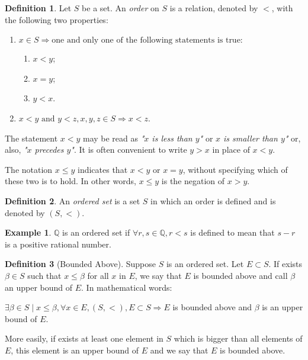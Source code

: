 \documentclass[11pt, a4paper]{amsart}
\numberwithin{equation}{section}
\theoremstyle{plain} %
\theoremstyle{definition}
\newtheorem{defn}{Definition}[section]
\newtheorem{ex}{Example}[section]
\theoremstyle{remark}
\begin{document}
\begin{defn}
Let $S$ be a set. An \textit{order} on $S$ is a relation, denoted by $<$, with the following two properties:
\begin{enumerate}
    \item $x \in S \Rightarrow \text{one and only one of the following statements is true:}$
    \begin{enumerate}
        \item $x<y$;
        \item $x=y$;
        \item $y<x$.
    \end{enumerate}
    \item $x<y \text{ and } y<z, x,y,z \in S \Rightarrow x<z$.
\end{enumerate}
\end{defn}

The statement $x<y$ may be read as \textit{"$x$ is less than $y$"} or \textit{$x$ is smaller than $y$"} or, also, \textit{"$x$ precedes $y$"}. It is often convenient to write $y>x$ in place of $x<y$.

The notation $x\leq y$ indicates that $x<y$ or $x=y$, without specifying which of these two is to hold. In other words, $x\leq y$ is the negation of $x>y$.

\begin{defn}
An \textit{ordered set} is a set $S$ in which an order is defined and is denoted by $(S, <)$.
\end{defn}

\begin{ex}
$\mathbb{Q}$ is an ordered set if $\forall r,s \in \mathbb{Q}, r<s$ is defined to mean that $s-r$ is a positive rational number.
\end{ex}

\begin{defn}[Bounded Above]
Suppose $S$ is an ordered set. Let $E\subset S$. If exists $\beta \in S$ such that $x \leq \beta$ for all $x$ in $E$, we say that $E$ is bounded above and call $\beta$ an upper bound of $E$. In mathematical words:

\begin{center}
    $\exists \beta\in S \mid x\leq\beta, \forall x\in E,(S,<),E\subset S\Rightarrow E$ is bounded above and $\beta$ is an upper bound of $E$.
\end{center}
\end{defn}
More easily, if exists at least one element in $S$ which is bigger than all elements of $E$, this element is an upper bound of $E$ and we say that $E$ is bounded above.
\end{document}
